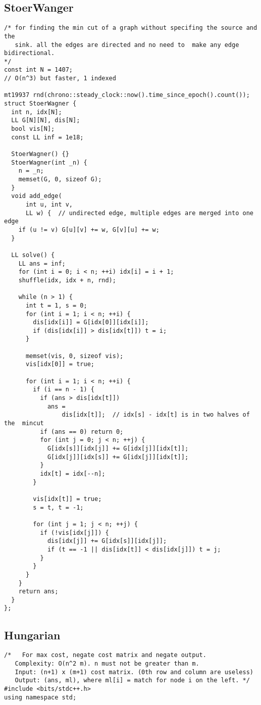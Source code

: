 \documentclass[FSZ,a4paper,onesided]{article}
\begin{document}
\begin{multicols*}{\COLS}
\subsection{StoerWanger}
\begin{lstlisting}
/* for finding the min cut of a graph without specifing the source and  the
   sink. all the edges are directed and no need to  make any edge bidirectional.
*/
const int N = 1407;
// O(n^3) but faster, 1 indexed

mt19937 rnd(chrono::steady_clock::now().time_since_epoch().count());
struct StoerWagner {
  int n, idx[N];
  LL G[N][N], dis[N];
  bool vis[N];
  const LL inf = 1e18;

  StoerWagner() {}
  StoerWagner(int _n) {
    n = _n;
    memset(G, 0, sizeof G);
  }
  void add_edge(
      int u, int v,
      LL w) {  // undirected edge, multiple edges are merged into one edge
    if (u != v) G[u][v] += w, G[v][u] += w;
  }

  LL solve() {
    LL ans = inf;
    for (int i = 0; i < n; ++i) idx[i] = i + 1;
    shuffle(idx, idx + n, rnd);

    while (n > 1) {
      int t = 1, s = 0;
      for (int i = 1; i < n; ++i) {
        dis[idx[i]] = G[idx[0]][idx[i]];
        if (dis[idx[i]] > dis[idx[t]]) t = i;
      }

      memset(vis, 0, sizeof vis);
      vis[idx[0]] = true;

      for (int i = 1; i < n; ++i) {
        if (i == n - 1) {
          if (ans > dis[idx[t]])
            ans =
                dis[idx[t]];  // idx[s] - idx[t] is in two halves of the  mincut
          if (ans == 0) return 0;
          for (int j = 0; j < n; ++j) {
            G[idx[s]][idx[j]] += G[idx[j]][idx[t]];
            G[idx[j]][idx[s]] += G[idx[j]][idx[t]];
          }
          idx[t] = idx[--n];
        }

        vis[idx[t]] = true;
        s = t, t = -1;

        for (int j = 1; j < n; ++j) {
          if (!vis[idx[j]]) {
            dis[idx[j]] += G[idx[s]][idx[j]];
            if (t == -1 || dis[idx[t]] < dis[idx[j]]) t = j;
          }
        }
      }
    }
    return ans;
  }
};
\end{lstlisting}
\subsection{Hungarian}
\begin{lstlisting}
/*   For max cost, negate cost matrix and negate output.
   Complexity: O(n^2 m). n must not be greater than m.
   Input: (n+1) x (m+1) cost matrix. (0th row and column are useless)
   Output: (ans, ml), where ml[i] = match for node i on the left. */
#include <bits/stdc++.h>
using namespace std;


\end{lstlisting}
\end{multicols*}
\end{document}
